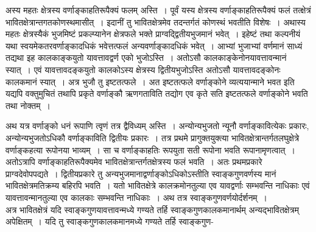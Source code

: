 \documentclass[11pt, openany]{book}
\begin{document}
\noindent अस्य महतः क्षेत्रस्य वर्णाङ्काहतिरूपैक्यं फलम् अस्ति~। पूर्वं यस्य क्षेत्रस्य वर्णाङ्काहतिरूपैक्यं फलं तत्क्षेत्रं भावितक्षेत्रान्तगतकोणस्थमासीत्~। इदानीं तु भावितक्षेत्रमेव तदन्तर्गतं कोणस्थं भवतीति विशेषः~। अथास्य महतः क्षेत्रस्यैकं भुजमिष्टं प्रकल्प्यानेन क्षेत्रफले भक्ते प्राग्वद्द्वितीयभुजमानं भवेत्~। इहेष्टं तथा कल्पनीयं यथा 
स्वयमेकतरवर्णाङ्कादधिकं भवेत्तत्फलं अन्यवर्णाङ्कादधिकं भवेत्~। आभ्यां
भुजाभ्यां वर्णमानं साध्यं तद्यथा इह कालकाङ्कयुतो यावत्तावद्वर्ण एको 
भुजोऽस्ति~। अतोऽसौ कालकाङ्केनोनयावत्तावन्मानं स्यात्~। एवं 
यावत्तावदङ्कयुतो कालकोऽस्य क्षेत्रस्य द्वितीयभुजोऽस्ति अतोऽसौ 
यावत्तावदङ्कोनः कालकमानं स्यात्~। अत्र भुजौ तु इष्टतत्फले~। अत 
इष्टतत्फले वर्णाङ्कोने व्यत्ययान्माने भवत इति यद्यपि वक्तुमुचितं तथापि
प्रकृते वर्णाङ्कौ ऋणगताविति तद्योग एव कृते सति इष्टतत्फले वर्णाङ्कोने
भवति तथा नोक्तम्~।
\newpage

 अथ यत्र वर्णाङ्को धनं रूपाणि त्वृणं तत्र द्वैविध्यम् अस्ति~। 
अन्योन्यभुजतो न्यूनौ वर्णाङ्कावित्येकः प्रकारः, अन्योन्यभुजतोऽधिकौ
वर्णाङ्काविति द्वितीयः प्रकारः~। तत्र प्रथमे प्रागुक्तयुक्त्या भावितक्षेत्रान्तर्गतलघुक्षेत्रे 
वर्णाङ्कहत्या रूपोनया भाव्यम्~। सा च वर्णाङ्काहतिः रूपयुता सती 
रूपोना भवति रूपानामृणत्वात्~। अतोऽत्रापि वर्णाङ्काहतिरूपैक्यमेव भावितक्षेत्रान्तर्गतक्षेत्रस्य फलं भवति~। अतः प्रथमप्रकारे प्राग्वदेवोपपद्यते~। 
द्वितीयप्रकारे तु अन्यभुजमानाद्वर्णाङ्कोऽधिकोऽस्तीति स्वाङ्कगुणवर्णस्य मानं 
भावितक्षेत्रमतिक्रम्य बहिरपि भवति~। यतो भावितक्षेत्रे कालक्रमोनतुल्या 
एव यावद्वर्णाः सम्भवन्ति नाधिकाः एवं यावत्तावन्मानतुल्या एव कालकाः 
सम्भवन्ति नाधिकाः~। अथ तत्र स्वाङ्कगुणवर्णयोर्दर्शनम्~। \\

\vspace{-3mm}
 अत्र भावितक्षेत्रं यदि स्वाङ्कगुणयावत्तावन्मध्ये गण्यते तर्हि
स्वाङ्कगुणकालकमानार्थम् अन्यद्भावितक्षेत्रम् अपेक्षितम्~। यदि तु स्वाङ्कगुणकालकमानमध्ये गण्यते तर्हि स्वाङ्कगुण-
\end{document}
